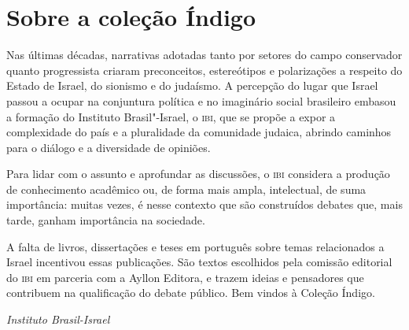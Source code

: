 \chapter{Sobre a coleção Índigo}

Nas últimas décadas, narrativas adotadas tanto por setores do campo conservador quanto progressista criaram preconceitos, estereótipos e polarizações a respeito do Estado de Israel, do sionismo e do judaísmo. A percepção do lugar que Israel passou a ocupar na conjuntura política e no imaginário social brasileiro embasou a formação do Instituto Brasil"-Israel, o \textsc{ibi}, que se propõe a expor a complexidade do país e a pluralidade da comunidade judaica, abrindo caminhos para o diálogo e a diversidade de opiniões.

Para lidar com o assunto e aprofundar as discussões, o \textsc{ibi} considera a produção de conhecimento acadêmico ou, de forma mais ampla, intelectual, de suma importância: muitas vezes, é nesse contexto que são construídos debates que, mais tarde, ganham importância na sociedade.

A falta de livros, dissertações e teses em português sobre temas relacionados a Israel incentivou essas publicações. São textos escolhidos pela comissão editorial do \textsc{ibi} em parceria com a Ayllon Editora, e trazem ideias e pensadores que contribuem na qualificação do debate público. Bem vindos à Coleção Índigo.

\medskip

\hfill\textit{Instituto Brasil-Israel}